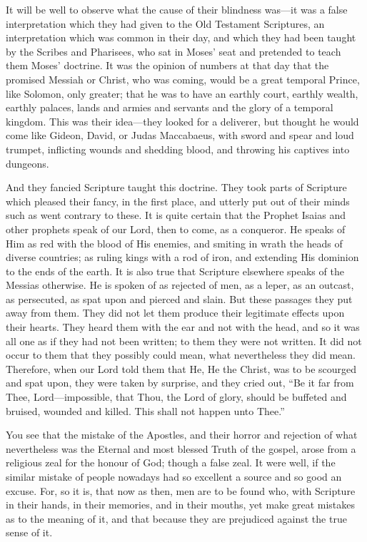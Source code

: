It will be well to observe what the cause of
their blindness was—it was a false interpretation which they had
given to the Old Testament Scriptures, an interpretation which was
common in their day, and which they had been taught by the Scribes and
Pharisees, who sat in Moses' seat and pretended to teach them Moses'
doctrine. It was the opinion of numbers at that day that the promised
Messiah or Christ, who was coming, would be a great temporal Prince,
like Solomon, only greater; that he was to have an earthly court,
earthly wealth, earthly palaces, lands and armies and servants and the
glory of a temporal kingdom. This was their idea—they looked for a
deliverer, but thought he would come like Gideon, David, or Judas
Maccabaeus, with sword and spear and loud trumpet, inflicting wounds
and shedding blood, and throwing his captives into dungeons.

And they fancied Scripture taught this doctrine.
They took parts of Scripture which pleased their fancy, in the first
place, and utterly put out of their minds such as went contrary to
these. It is quite certain that the Prophet Isaias and other prophets
speak of our Lord, then to come, as a conqueror. He speaks of Him as
red with the blood of His enemies, and smiting in wrath the heads of
diverse countries; as ruling kings with a rod of iron, and extending
His dominion to the ends of the earth. It is also true that
Scripture elsewhere speaks of the Messias otherwise. He is spoken of
as rejected of men, as a leper, as an outcast, as persecuted, as spat
upon and pierced and slain. But these passages they put away from
them. They did not let them produce their legitimate effects upon
their hearts. They heard them with the ear and not with the head, and
so it was all one as if they had not been written; to them they were
not written. It did not occur to them that they possibly could mean,
what nevertheless they did mean. Therefore, when our Lord told them
that He, He the Christ, was to be scourged and spat upon, they were
taken by surprise, and they cried out, ``Be it far from Thee,
Lord—impossible, that Thou, the Lord of glory, should be buffeted
and bruised, wounded and killed. This shall not happen unto Thee.''

You see that the mistake of the Apostles, and
their horror and rejection of what nevertheless was the Eternal and
most blessed Truth of the gospel, arose from a religious zeal for the
honour of God; though a false zeal. It were well, if the similar
mistake of people nowadays had so excellent a source and so good an
excuse. For, so it is, that now as then, men are to be found who, with
Scripture in their hands, in their memories, and in their mouths, yet
make great mistakes as to the meaning of it, and that because they are
prejudiced against the true sense of it.

